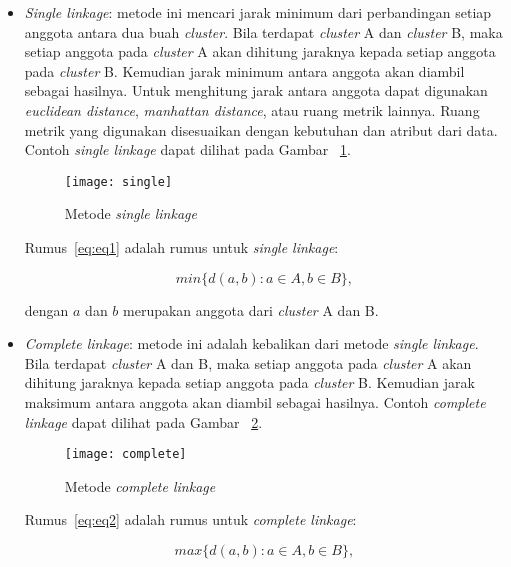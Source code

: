 \begin{itemize}

\item \textit{Single linkage}: metode ini mencari jarak minimum dari perbandingan setiap anggota antara dua buah \textit{cluster}. Bila terdapat \textit{cluster} A dan \textit{cluster} B, maka setiap anggota pada \textit{cluster} A akan dihitung jaraknya kepada setiap anggota pada \textit{cluster} B. Kemudian jarak minimum antara anggota akan diambil sebagai hasilnya. Untuk menghitung jarak antara anggota dapat digunakan \textit{euclidean distance}, \textit{manhattan distance}, atau ruang metrik lainnya. Ruang metrik yang digunakan disesuaikan dengan kebutuhan dan atribut dari data. Contoh \textit{single linkage} dapat dilihat pada Gambar ~\ref{fig:single}. 

\begin{figure}[H]
    \centering  
    \texttt{[image: single]}  
    \caption[Metode \textit{single linkage} ]{Metode \textit{single linkage}} 
    \label{fig:single} 
\end{figure}

Rumus~\ref{eq:eq1} adalah rumus untuk \textit{single linkage}:

\begin{equation} \label{eq:eq1}
min\{ d(a,b): a \in A, b \in B\}, 
\end{equation}

dengan $a$ dan $b$ merupakan anggota dari \textit{cluster} A dan B.\\

\item \textit{Complete linkage}: metode ini adalah kebalikan dari metode \textit{single linkage}. Bila terdapat \textit{cluster} A dan B, maka setiap anggota pada \textit{cluster} A akan dihitung jaraknya kepada setiap anggota pada \textit{cluster} B. Kemudian jarak maksimum antara anggota akan diambil sebagai hasilnya. Contoh  \textit{complete linkage} dapat dilihat pada Gambar ~\ref{fig:complete}.

\begin{figure}[H]
    \centering  
    \texttt{[image: complete]}  
    \caption[Metode \textit{complete linkage} ]{Metode \textit{complete linkage}} 
    \label{fig:complete} 
\end{figure}

Rumus~\ref{eq:eq2} adalah rumus untuk \textit{complete linkage}:

\begin{equation} \label{eq:eq2}
max\{ d(a,b): a \in A, b \in B\},
\end{equation}


\end{itemize}
